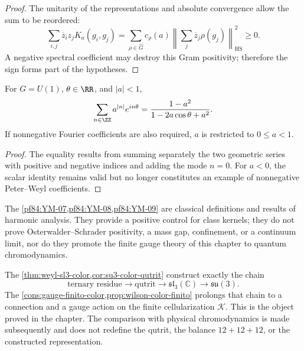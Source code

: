 \begin{proof}
The unitarity of the representations and absolute convergence allow
the sum to be reordered:
\[
 \sum_{i,j}\overline z_i z_jK_a(g_i,g_j)
 =
 \sum_{\rho\in\widehat G}
 c_\rho(a)
 \left\lVert
 \sum_j\overline z_j\rho(g_j)
 \right\rVert_{\mathrm{HS}}^2\ge0.
\]
A negative spectral coefficient may destroy this Gram positivity;
therefore the sign forms part of the hypotheses.
\end{proof}

\begin{lemma}
\label{pf84:YM-09}
For \(G=U(1)\), \(\theta\in\RR\), and \(|a|<1\),
\[
 \sum_{n\in\ZZ}a^{|n|}e^{in\theta}
 =\frac{1-a^2}{1-2a\cos\theta+a^2}.
\]
If nonnegative Fourier coefficients are also required,
\(a\) is restricted to \(0\le a<1\).
\end{lemma}

\begin{proof}
The equality results from summing separately the two geometric series with
positive and negative indices and adding the mode \(n=0\). For \(a<0\), the
scalar identity remains valid but no longer constitutes an example of
nonnegative Peter--Weyl coefficients.
\end{proof}

\begin{remark}
The \cref{pf84:YM-07,pf84:YM-08,pf84:YM-09} are classical definitions and results
of harmonic analysis. They provide a positive control for class kernels; they
do not prove Osterwalder--Schrader positivity, a mass gap, confinement, or a
continuum limit, nor do they promote the finite gauge theory of this chapter
to quantum chromodynamics.
\end{remark}

\begin{exactbox}[title={Algebraic closure of color}]
The \cref{thm:weyl-sl3-color,cor:su3-color-qutrit} construct exactly the
chain
\[
\text{ternary residue}\longrightarrow
\text{qutrit}\longrightarrow
\mathfrak{sl}_3(\mathbb C)\longrightarrow\mathfrak{su}(3).
\]
The \cref{cons:gauge-finito-color,prop:wilson-color-finito} prolongs that
chain to a connection and a gauge action on the finite cellularization
\(\mathcal K\). This is the object proved in the chapter. The
comparison with physical chromodynamics is made subsequently and does not redefine the
qutrit, the balance \(12+12+12\), or the constructed representation.
\end{exactbox}

